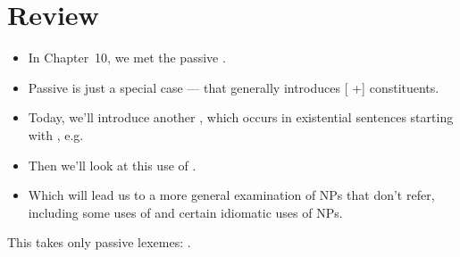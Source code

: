 \documentclass[a4paper,landscape,headrule,footrule]{foils}
\begin{document}
\maketitle




\overview
{}

\section[Review: the copula \lex{be}]{Review}


\begin{itemize}
\item In Chapter~10, we met the passive .
\item Passive  is just a special case --- that 
generally introduces [ +] constituents.
\item Today, we’ll introduce another , which 
occurs in existential sentences starting with 
, e.g.\ 
\item Then we’ll look at this use of .
\item Which will lead us to a more general 
examination of NPs that don’t refer, including 
some uses of  and certain idiomatic uses of 
NPs.
\end{itemize}





This takes only passive lexemes: .
\end{document}
